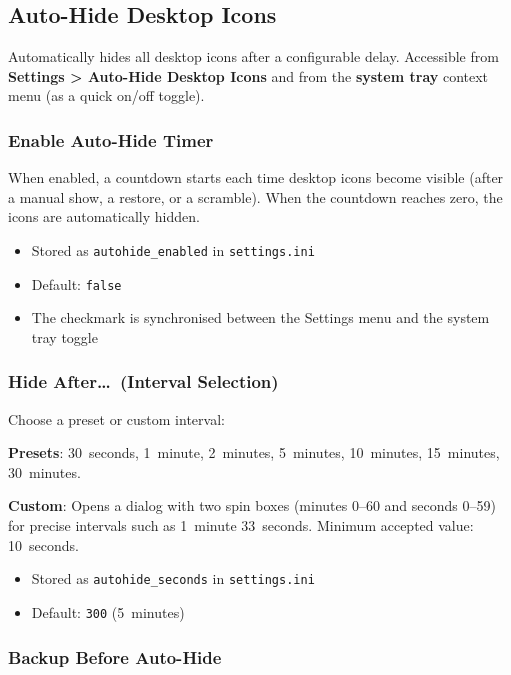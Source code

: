 \documentclass[a4paper,11pt]{article}
\begin{document}
\subsection{Auto-Hide Desktop Icons}

Automatically hides all desktop icons after a configurable delay.
Accessible from \textbf{Settings > Auto-Hide Desktop Icons} and from
the \textbf{system tray} context menu (as a quick on/off toggle).

\subsubsection{Enable Auto-Hide Timer}

When enabled, a countdown starts each time desktop icons become visible
(after a manual show, a restore, or a scramble). When the countdown
reaches zero, the icons are automatically hidden.

\begin{itemize}
  \item Stored as \texttt{autohide\_enabled} in \texttt{settings.ini}
  \item Default: \texttt{false}
  \item The checkmark is synchronised between the Settings menu and the
    system tray toggle
\end{itemize}

\subsubsection{Hide After\ldots\ (Interval Selection)}

Choose a preset or custom interval:

\textbf{Presets}: 30~seconds, 1~minute, 2~minutes, 5~minutes,
10~minutes, 15~minutes, 30~minutes.

\textbf{Custom}: Opens a dialog with two spin boxes (minutes 0--60 and
seconds 0--59) for precise intervals such as 1~minute 33~seconds.
Minimum accepted value: 10~seconds.

\begin{itemize}
  \item Stored as \texttt{autohide\_seconds} in \texttt{settings.ini}
  \item Default: \texttt{300} (5~minutes)
\end{itemize}

\subsubsection{Backup Before Auto-Hide}
\end{document}
